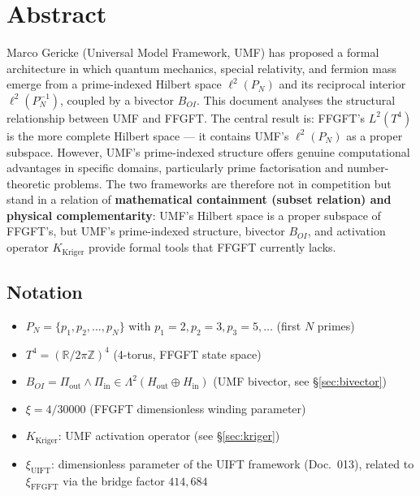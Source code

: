 
\section*{Abstract}

Marco Gericke (Universal Model Framework, UMF) has proposed a formal architecture
in which quantum mechanics, special relativity, and fermion mass emerge from a
prime-indexed Hilbert space $\ell^2(P_N)$ and its reciprocal interior
$\ell^2(P_N^{-1})$, coupled by a bivector $B_{OI}$. This document analyses the
structural relationship between UMF and FFGFT. The central result is:
FFGFT's $L^2(T^4)$ is the more complete Hilbert space — it contains UMF's
$\ell^2(P_N)$ as a proper subspace. However, UMF's prime-indexed structure offers
genuine computational advantages in specific domains, particularly prime
factorisation and number-theoretic problems. The two frameworks are therefore not in competition but stand in a relation of \textbf{mathematical containment (subset relation) and physical complementarity}: UMF's Hilbert space is a proper subspace of FFGFT's, but UMF's prime-indexed structure, bivector $B_{OI}$, and activation operator $K_\text{Kriger}$ provide formal tools that FFGFT currently lacks.

\subsection*{Notation}

\begin{itemize}
  \item $P_N = \{p_1, p_2, \dots, p_N\}$ with $p_1=2, p_2=3, p_3=5, \dots$ (first $N$ primes)
  \item $T^4 = (\mathbb{R}/2\pi\mathbb{Z})^4$ (4-torus, FFGFT state space)
  \item $B_{OI} = \Pi_\text{out} \wedge \Pi_\text{in} \in \Lambda^2(H_\text{out} \oplus H_\text{in})$
    (UMF bivector, see \S\ref{sec:bivector})
  \item $\xi = 4/30000$ (FFGFT dimensionless winding parameter)
  \item $K_\text{Kriger}$: UMF activation operator (see \S\ref{sec:kriger})
  \item $\xi_\text{UIFT}$: dimensionless parameter of the UIFT framework (Doc.~013), related to $\xi_\text{FFGFT}$ via the bridge factor $414{,}684$
\end{itemize}

